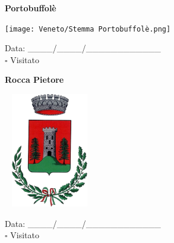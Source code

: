 \documentclass[a5paper,12pt]{article}
\begin{document}
\newpage

\noindent
\begin{minipage}[t]{0.45\textwidth}
    \begin{center}
        \textbf{Portobuffolè}
    \end{center}
    \vspace{-0.5cm} %
    \begin{center}
        \texttt{[image: Veneto/Stemma Portobuffolè.png]}
    \end{center}
    \vspace{-0.4cm} %
    \begin{flushleft}
        Data: \_\_\_\_/\_\_\_\_/\_\_\_\_\_\_\_\_\_\_\_\_ \\
        $\square$ Visitato
    \end{flushleft}
\end{minipage}
\hfill
\noindent
\begin{minipage}[t]{0.45\textwidth}
    \begin{center}
        \textbf{Rocca Pietore}
    \end{center}
    \vspace{-0.5cm} %
    \begin{center}
        \includegraphics[height= 5cm, width=4cm]{Veneto/Stemma Rocca Pietore.png}
    \end{center}
    \vspace{-0.4cm} %
    \begin{flushleft}
        Data: \_\_\_\_/\_\_\_\_/\_\_\_\_\_\_\_\_\_\_\_\_ \\
        $\square$ Visitato
    \end{flushleft}
\end{minipage}

\vspace{0.7cm}
\end{document}
